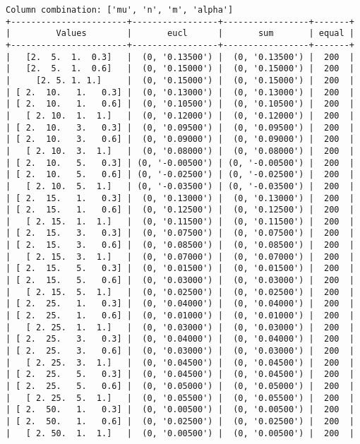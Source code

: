 \documentclass{article}
\begin{document}
\begin{verbatim}
Column combination: ['mu', 'n', 'm', 'alpha']
+-----------------------+-----------------+-----------------+-------+
|         Values        |       eucl      |       sum       | equal |
+-----------------------+-----------------+-----------------+-------+
|   [2.  5.  1.  0.3]   |  (0, '0.13500') |  (0, '0.13500') |  200  |
|   [2.  5.  1.  0.6]   |  (0, '0.15000') |  (0, '0.15000') |  200  |
|     [2. 5. 1. 1.]     |  (0, '0.15000') |  (0, '0.15000') |  200  |
| [ 2.  10.   1.   0.3] |  (0, '0.13000') |  (0, '0.13000') |  200  |
| [ 2.  10.   1.   0.6] |  (0, '0.10500') |  (0, '0.10500') |  200  |
|   [ 2. 10.  1.  1.]   |  (0, '0.12000') |  (0, '0.12000') |  200  |
| [ 2.  10.   3.   0.3] |  (0, '0.09500') |  (0, '0.09500') |  200  |
| [ 2.  10.   3.   0.6] |  (0, '0.09000') |  (0, '0.09000') |  200  |
|   [ 2. 10.  3.  1.]   |  (0, '0.08000') |  (0, '0.08000') |  200  |
| [ 2.  10.   5.   0.3] | (0, '-0.00500') | (0, '-0.00500') |  200  |
| [ 2.  10.   5.   0.6] | (0, '-0.02500') | (0, '-0.02500') |  200  |
|   [ 2. 10.  5.  1.]   | (0, '-0.03500') | (0, '-0.03500') |  200  |
| [ 2.  15.   1.   0.3] |  (0, '0.13000') |  (0, '0.13000') |  200  |
| [ 2.  15.   1.   0.6] |  (0, '0.12500') |  (0, '0.12500') |  200  |
|   [ 2. 15.  1.  1.]   |  (0, '0.11500') |  (0, '0.11500') |  200  |
| [ 2.  15.   3.   0.3] |  (0, '0.07500') |  (0, '0.07500') |  200  |
| [ 2.  15.   3.   0.6] |  (0, '0.08500') |  (0, '0.08500') |  200  |
|   [ 2. 15.  3.  1.]   |  (0, '0.07000') |  (0, '0.07000') |  200  |
| [ 2.  15.   5.   0.3] |  (0, '0.01500') |  (0, '0.01500') |  200  |
| [ 2.  15.   5.   0.6] |  (0, '0.03000') |  (0, '0.03000') |  200  |
|   [ 2. 15.  5.  1.]   |  (0, '0.02500') |  (0, '0.02500') |  200  |
| [ 2.  25.   1.   0.3] |  (0, '0.04000') |  (0, '0.04000') |  200  |
| [ 2.  25.   1.   0.6] |  (0, '0.01000') |  (0, '0.01000') |  200  |
|   [ 2. 25.  1.  1.]   |  (0, '0.03000') |  (0, '0.03000') |  200  |
| [ 2.  25.   3.   0.3] |  (0, '0.04000') |  (0, '0.04000') |  200  |
| [ 2.  25.   3.   0.6] |  (0, '0.03000') |  (0, '0.03000') |  200  |
|   [ 2. 25.  3.  1.]   |  (0, '0.04500') |  (0, '0.04500') |  200  |
| [ 2.  25.   5.   0.3] |  (0, '0.04500') |  (0, '0.04500') |  200  |
| [ 2.  25.   5.   0.6] |  (0, '0.05000') |  (0, '0.05000') |  200  |
|   [ 2. 25.  5.  1.]   |  (0, '0.05500') |  (0, '0.05500') |  200  |
| [ 2.  50.   1.   0.3] |  (0, '0.00500') |  (0, '0.00500') |  200  |
| [ 2.  50.   1.   0.6] |  (0, '0.02500') |  (0, '0.02500') |  200  |
|   [ 2. 50.  1.  1.]   |  (0, '0.00500') |  (0, '0.00500') |  200  |

\end{verbatim}
\end{document}
